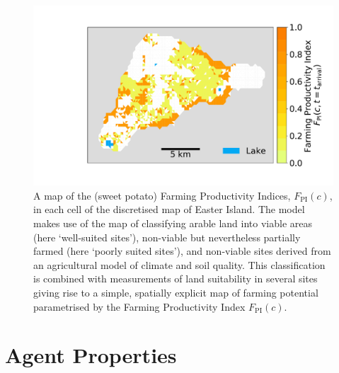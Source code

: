 \begin{figure}
	\centering
	\includegraphics[width=\textwidth]{images/Plot_F_PI_c.pdf}
	\caption{A map of the (sweet potato) Farming Productivity Indices, $F_\text{PI}(c)$, in each cell of the discretised map of Easter Island. The model makes use of the map of \citet{Puleston2017} classifying arable land into viable areas (here `well-suited sites'), non-viable but nevertheless partially farmed (here `poorly suited sites'), and non-viable sites derived from an agricultural model of climate and soil quality. 
	This classification is combined with measurements of land suitability in several sites \citep{Louwagie2006} giving rise to a simple, spatially explicit map of farming potential parametrised by the Farming Productivity Index $F_\text{PI}(c)$.}
	\label{fig:Map_agric}
\end{figure}


\section{Agent Properties}\label{sec:agentprops}

